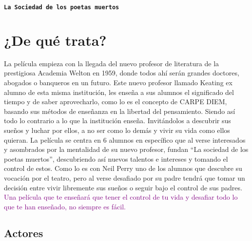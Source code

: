 \documentclass[a5 paper,11 pt]{article}
\begin{document}
\begin{center}
    \tt{\textbf{\Huge{La Sociedad de los poetas muertos}}}
\end{center}

\tt{
\section{¿De qué trata?}

La película empieza con la llegada del nuevo profesor de literatura de la prestigiosa Academia Welton en 1959, donde todos ahí serán grandes doctores, abogados o banqueros en un futuro. Este nuevo profesor llamado Keating ex alumno de esta misma institución, les enseña a sus alumnos el significado del tiempo y de saber aprovecharlo, como lo es el concepto de CARPE DIEM, basando sus métodos de enseñanza en la libertad del pensamiento. Siendo así todo lo contrario a lo que la institución enseña. Invitándolos a descubrir sus sueños y luchar por ellos, a no ser como lo demás y vivir su vida como ellos quieran. 
La película se centra en 6 alumnos en específico que al verse interesados y asombrados por la mentalidad de su nuevo profesor, fundan “La sociedad de los poetas muertos”, descubriendo así nuevos talentos e intereses y tomando el control de estos. Como lo es con Neil Perry uno de los alumnos que descubre su vocación por el teatro, pero al verse desafiado por su padre tendrá que tomar un decisión entre vivir libremente sus sueños o seguir bajo el control de sus padres. \textcolor{purple}{Una película que te enseñará que tener el control de tu vida y desafiar todo lo que te han enseñado, no siempre es fácil. }

\subsection{Actores}
\begin{enumerate}



\end{enumerate}}
\end{document}
